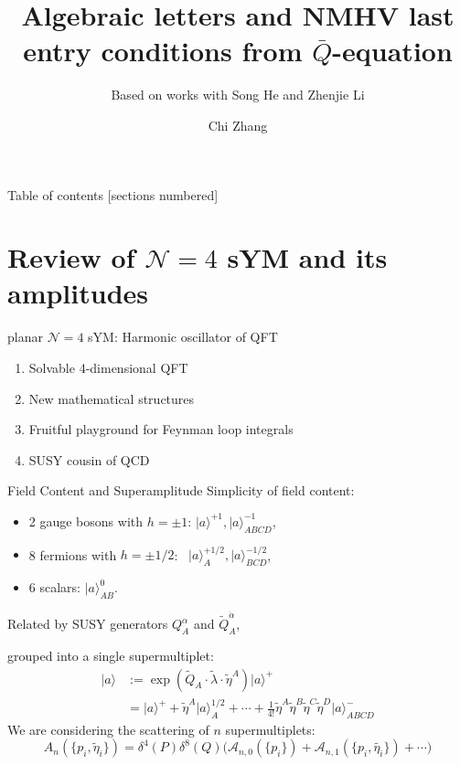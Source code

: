 \documentclass[10pt]{beamer}
\title{Algebraic letters and NMHV last entry conditions from $\bar{Q}$-equation}
\subtitle{\scriptsize Based on works with Song He and Zhenjie Li}
\date{}
\author{Chi Zhang}
\institute{Institute of Theoretical Physics, CAS}
\renewcommand{\tilde}{\widetilde}
\begin{document}
\maketitle

\begin{frame}{Table of contents}
  [sections numbered]
  \tableofcontents[hideallsubsections]
\end{frame}


\section{Review of $\mathcal{N}=4$ sYM and its amplitudes}
  



  
  \begin{frame}{planar $\mathcal{N}=4$ sYM: Harmonic oscillator of QFT}
  \begin{enumerate}
    \item Solvable 4-dimensional QFT
    \item New mathematical structures 
    \item Fruitful playground for Feynman loop integrals
    \item SUSY cousin of QCD
  \end{enumerate}

\end{frame}


\begin{frame}{Field Content and Superamplitude}
    Simplicity of field content:  
\begin{itemize}
    \item 2 gauge bosons with $h=\pm 1$: \quad   $\lvert a\rangle ^{+1}, \lvert a\rangle^{-1}_{ABCD} $,
    \item 8 fermions with $h=\pm 1/2$:  \qquad \!\!\, $\lvert a\rangle_{A} ^{+1/2}, \lvert a\rangle^{-1/2}_{BCD} $,
    \item 6 scalars: \qquad \qquad \qquad \qquad  \quad\:  $\lvert a\rangle_{AB} ^{0}$.
\end{itemize}
Related by SUSY generators $Q_{A}^{\alpha}$ and $\tilde{Q}_{A}^{\dot{\alpha}}$,

grouped into a \alert{single} supermultiplet:
\begin{align*}
\lvert a\rangle &:= \exp (\tilde{Q}_{A}\cdot\tilde{\lambda}\cdot \tilde{\eta}^{A}) \lvert a\rangle ^{+} \\
&= \lvert a \rangle ^{+}+ \tilde{\eta}^{A}\lvert a\rangle_{A}^{1/2}+\cdots +\frac{1}{4!}\tilde{\eta}^{A}\tilde{\eta}^{B}\tilde{\eta}^{C}\tilde{\eta}^{D}\lvert a\rangle^{-}_{ABCD}
\end{align*}
We are considering the scattering of $n$ supermultiplets:
\[
A_{n}(\{p_{i},\tilde{\eta}_{i}\}) = \delta^{4}(P)\delta^{8}(Q)\bigl(\mathcal{A}_{n,0}(\{p_{i}\})+\mathcal{A}_{n,1}(\{p_{i},\tilde{\eta_{i}}\})+\cdots\bigr)
\]
\end{frame}
\end{document}
